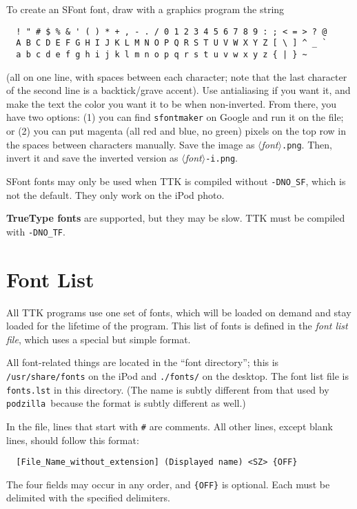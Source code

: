 \documentclass[12pt,letterpaper]{report}
\def\pz{\texttt{podzilla}}
\let\ttt\tt
\def\tt{\def\_{{\ttt\char`\_}}\ttt}
\def\texttt#1{{\tt #1}}
\def\<#1>{\leavevmode\hbox{$\langle${\sl#1\/}$\rangle$}}
\begin{document}
To create an SFont font, draw with a graphics program the string
\begin{verbatim}
  ! " # $ % & ' ( ) * + , - . / 0 1 2 3 4 5 6 7 8 9 : ; < = > ? @
  A B C D E F G H I J K L M N O P Q R S T U V W X Y Z [ \ ] ^ _ `
  a b c d e f g h i j k l m n o p q r s t u v w x y z { | } ~
\end{verbatim}
\begin{comment}
$
\end{comment} %
(all on one line, with spaces between each character; note that the last
character of the second line is a backtick/grave accent). Use antialiasing if you want it, and make
the text the color you want it to be when non-inverted.
From there, you have two options: (1) you can find {\tt sfontmaker} on Google and run it on the file; or (2) you
can put magenta (all red and blue, no green) pixels on the top row in the spaces between characters manually.
Save the image as \<font>\verb|.png|. Then, invert it and save the inverted version as \<font>\verb|-i.png|.

SFont fonts may only be used when TTK is compiled without {\tt -DNO_SF}, which is not the default. They only
work on the iPod photo.

{\bf TrueType fonts} are supported, but they may be slow. TTK must be compiled with {\tt -DNO_TF}.

\section{Font List}
All TTK programs use one set of fonts, which will be loaded on demand and stay loaded for the lifetime
of the program. This list of fonts is defined in the {\sl font list file}, which uses a special but simple
format.

All font-related things are located in the ``font directory''; this is \verb|/usr/share/fonts| on the iPod
and \verb|./fonts/| on the desktop. The font list file is \verb|fonts.lst| in this directory. (The name
is subtly different from that used by \pz\ because the format is subtly different as well.)

In the file, lines that start with {\tt \#} are comments. All other lines, except blank lines, should
follow this format:
\begin{verbatim}
  [File_Name_without_extension] (Displayed name) <SZ> {OFF}
\end{verbatim}
The four fields may occur in any order, and \verb|{OFF}| is optional. Each must be delimited with the
specified delimiters.
\end{document}
